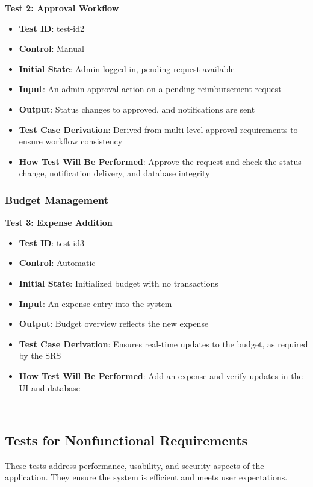 \documentclass[12pt, titlepage]{article}
\begin{document}
\textbf{Test 2: Approval Workflow}
\begin{itemize}
    \item \textbf{Test ID}: test-id2
    \item \textbf{Control}: Manual
    \item \textbf{Initial State}: Admin logged in, pending request available
    \item \textbf{Input}: An admin approval action on a pending reimbursement request
    \item \textbf{Output}: Status changes to approved, and notifications are sent
    \item \textbf{Test Case Derivation}: Derived from multi-level approval requirements to ensure workflow consistency
    \item \textbf{How Test Will Be Performed}: Approve the request and check the status change, notification delivery, and database integrity
\end{itemize}

\subsubsection{Budget Management}

\textbf{Test 3: Expense Addition}
\begin{itemize}
    \item \textbf{Test ID}: test-id3
    \item \textbf{Control}: Automatic
    \item \textbf{Initial State}: Initialized budget with no transactions
    \item \textbf{Input}: An expense entry into the system
    \item \textbf{Output}: Budget overview reflects the new expense
    \item \textbf{Test Case Derivation}: Ensures real-time updates to the budget, as required by the SRS
    \item \textbf{How Test Will Be Performed}: Add an expense and verify updates in the UI and database
\end{itemize}

---

\subsection{Tests for Nonfunctional Requirements}

These tests address performance, usability, and security aspects of the application. They ensure the system is efficient and meets user expectations.
\end{document}
